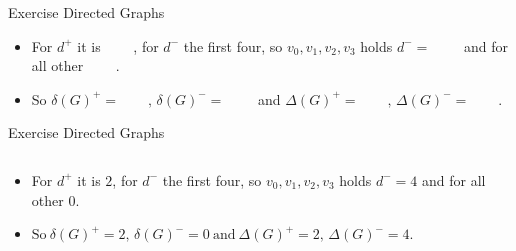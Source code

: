 \begin{frame}[allowframebreaks]{Exercise \thesection}{Directed Graphs}
  \begin{exercisenoinc}
    \begin{itemize}
      \item For $d^+$ it is $\qquad$, for $d^-$ the first four, so $v_0, v_1, v_2, v_3$ holds $d^- = \qquad$ and for all other $\qquad$.
      \item So $\delta(G)^{+}=\qquad, \,\delta(G)^{-}=\qquad$ and $\Delta(G)^{+}=\qquad,\,\Delta(G)^{-}=\qquad.$
    \end{itemize}
  \end{exercisenoinc}
\end{frame}
\begin{frame}[allowframebreaks]{Exercise \thesection}{Directed Graphs}
  \begin{solution}
    \begin{columns}
      \begin{column}{0.5\textwidth}
        \begin{itemize}
          \item For $d^+$ it is $2$, for $d^-$ the first four, so $v_0, v_1, v_2, v_3$ holds $d^- = 4$ and for all other $0$.
          \item $\mathrm{So~}\delta(G)^{+}=2, \,\delta(G)^{-}=0\mathrm{~and~}\Delta(G)^{+}=2,\,\Delta(G)^{-}=4.$
        \end{itemize}
      \end{column}
      \begin{column}{0.5\textwidth}
      \end{column}
    \end{columns}
  \end{solution}
\end{frame}
